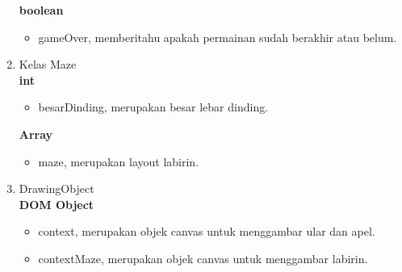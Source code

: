 \begin{enumerate}
\textbf{boolean}
\begin{itemize}
	\item gameOver, memberitahu apakah permainan sudah berakhir atau belum.
\end{itemize}

\item Kelas Maze \\
\textbf{int}

\begin{itemize}
	\item besarDinding, merupakan besar lebar dinding.
\end{itemize}

\textbf{Array}

\begin{itemize}
	\item maze, merupakan layout labirin.
\end{itemize}

\item DrawingObject \\
\textbf{DOM Object}

\begin{itemize}
	\item context, merupakan objek canvas untuk menggambar ular dan apel.
	\item contextMaze, merupakan objek canvas untuk menggambar labirin.
\end{itemize}

\end{enumerate}